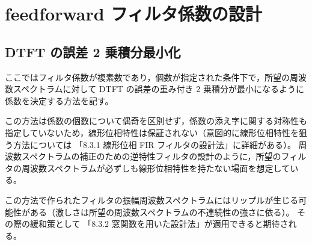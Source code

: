 \section{feedforward フィルタ係数の設計}
    \subsection{DTFT の誤差 2 乗積分最小化}
        \newcommand*{\Hideal}{H_\text{ideal}}
        \newcommand*{\vhOpt}{\bm{h}_\text{opt}}
        ここではフィルタ係数が複素数であり，個数が指定された条件下で，所望の周波数スペクトラムに対して DTFT の誤差の重み付き 2 乗積分が最小になるように係数を決定する方法を記す。
        \par
        この方法は係数の個数について偶奇を区別せず，係数の添え字に関する対称性も指定していないため，線形位相特性は保証されない（意図的に線形位相特性を狙う方法については \cite{learn_sp_from_basic} 「8.3.1 線形位相 FIR フィルタの設計法」に詳細がある）。
        周波数スペクトラムの補正のための逆特性フィルタの設計のように，所望のフィルタの周波数スペクトラムが必ずしも線形位相特性を持たない場面を想定している。
        \par
        この方法で作られたフィルタの振幅周波数スペクトラムにはリップルが生じる可能性がある（激しさは所望の周波数スペクトラムの不連続性の強さに依る）。
        その際の緩和策として \cite{learn_sp_from_basic} 「8.3.2 窓関数を用いた設計法」が適用できると期待される。

